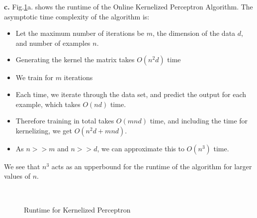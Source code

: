 \documentclass{article}
\begin{document}
\textbf{c.} Fig.\ref{fig:Runtime}a. shows the runtime of the Online Kernelized Perceptron Algorithm. The asymptotic time complexity of the algorithm is:
\begin{itemize}
\item Let the maximum number of iterations be $m$, the dimension of the data $d$, and number of examples $n$.
\item Generating the kernel the matrix takes $O(n^{2}d)$ time
\item We train for $m$ iterations
\item Each time, we iterate through the data set, and predict the output for each example, which takes $O(nd)$ time.
\item Therefore training in total takes $O(mnd)$ time, and including the time for kernelizing, we get $O(n^{2}d + mnd)$.
\item As $n>>m$ and $n>>d$, we can approximate this to $O(n^{3})$ time.
\end{itemize}

We see that $n^{3}$ acts as an upperbound for the runtime of the algorithm for larger values of $n$.


\begin{figure}[H]
	\centering
    \label{fig:a}
    \label{fig:b}\\
    \caption{Runtime for Kernelized Perceptron}
    \label{fig:Runtime}%
\end{figure}
\end{document}
